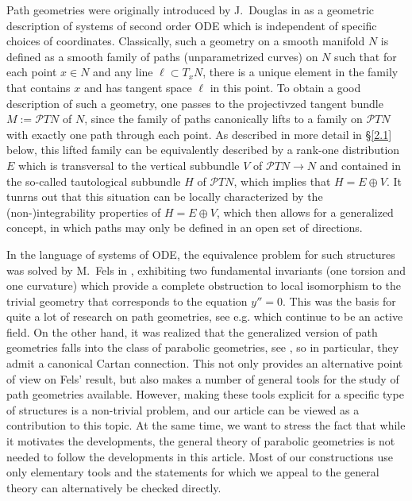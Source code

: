 \documentclass[11pt]{amsart}
\numberwithin{proposition}{section}
\numberwithin{equation}{section}
\begin{document}
Path geometries were originally introduced by J.\ Douglas in \cite{Douglas} as a geometric description of systems of second order ODE which is independent of specific choices of coordinates. Classically, such a geometry on a smooth manifold $N$ is defined as a smooth family of paths (unparametrized curves) on $N$ such that for each point $x\in N$ and any line $\ell\subset T_xN$, there is a unique element in the family that contains $x$ and has tangent space $\ell$ in this point. To obtain a good description of such a geometry, one passes to the projectivzed tangent bundle $M:=\mathcal PTN$ of $N$, since the family of paths canonically lifts to a family on $\mathcal PTN$ with exactly one path through each point. As described in more detail in \S \ref{2.1} below, this lifted family can be equivalently described by a rank-one distribution $E$ which is transversal to the vertical subbundle $V$ of $\mathcal PTN\to N$ and contained in the so-called tautological subbundle $H$ of $\mathcal PTN$, which implies that $H=E\oplus V$. It tunrns out that this situation can be locally characterized by the (non-)integrability properties of $H=E\oplus V$, which then allows for a generalized concept, in which paths may only be defined in an open set of directions. 

In the language of systems of ODE, the equivalence problem for such structures was solved  by M.\ Fels in \cite{Fels}, exhibiting two fundamental invariants (one torsion and one curvature) which provide a complete obstruction to local isomorphism to the trivial geometry that corresponds to the equation $y''=0$. This was the basis for quite a lot of research on path geometries, see e.g. \cites{BGH,Grossman,Crampin-Saunders,CZ} which continue to be an active field. On the other hand, it was realized that the generalized version of path geometries falls into the class of parabolic geometries, see \cite{Book}, so in particular, they admit a canonical Cartan connection. This not only provides an alternative point of view on Fels' result, but also makes a number of general tools for the study of path geometries available. However, making these tools explicit for a specific type of structures is a non-trivial problem, and our article can be viewed as a contribution to this topic. At the same time, we want to stress the fact that while it motivates the developments, the general theory of parabolic geometries is not needed to follow the developments in this article. Most of our constructions use only elementary tools and the statements for which we appeal to the general theory can alternatively be checked directly. 
\end{document}
